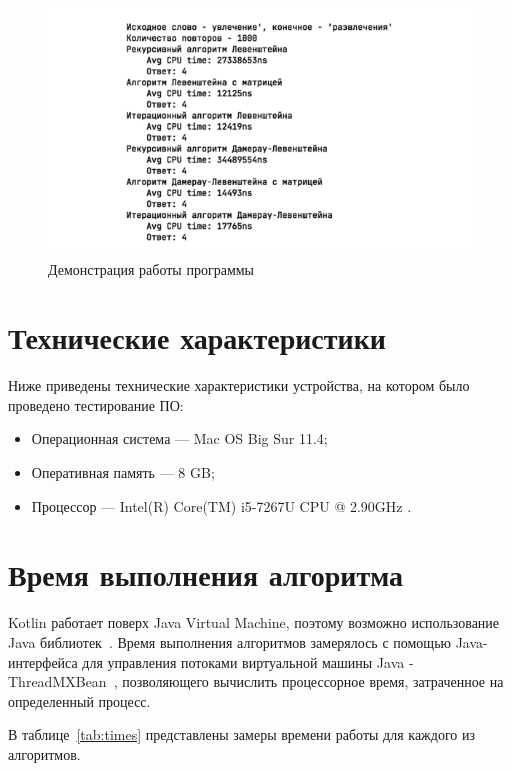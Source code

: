 \documentclass[12pt]{report}
\begin{document}
    \begin{figure}[H]
        \centering
        \includegraphics[scale=1]{img/workSample}
        \caption{Демонстрация работы программы}
        \label{fig:workSample}
    \end{figure}


    \section{Технические характеристики}
    Ниже приведены технические характеристики устройства, на котором было проведено тестирование ПО:
    \begin{itemize}
        \item Операционная система --- Mac OS Big Sur 11.4;
        \item Оперативная память --- 8 GB;
        \item Процессор --- Intel(R) Core(TM) i5-7267U CPU @ 2.90GHz \cite{i5}.
    \end{itemize}


    \section{Время выполнения алгоритма}
    Kotlin работает поверх Java Virtual Machine, поэтому возможно использование Java библиотек~\cite{kotlin}.
    Время выполнения алгоритмов замерялось с помощью Java-интерфейса для управления потоками
    виртуальной машины Java - ThreadMXBean~\cite{threadMXBean}, позволяющего вычислить процессорное время,
    затраченное на определенный процесс.

    В таблице~\ref{tab:times} представлены замеры времени работы для каждого из алгоритмов.
\end{document}
